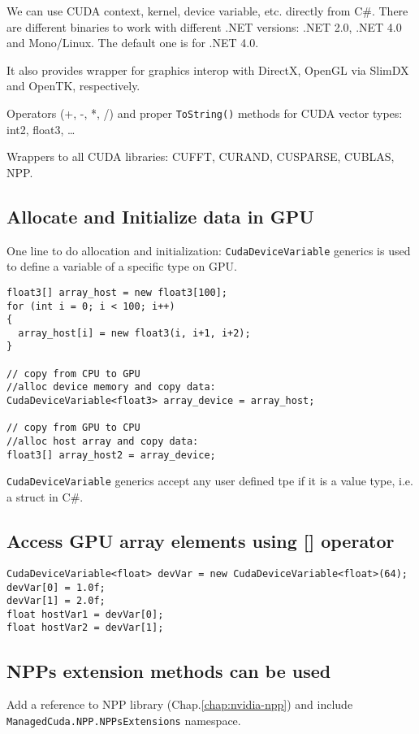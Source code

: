 We can use CUDA context, kernel, device variable, etc. directly from C\#.
There are different binaries to work with different .NET versions: .NET 2.0,
.NET 4.0 and Mono/Linux. The default one is for .NET 4.0.

It also provides wrapper for graphics interop with DirectX, OpenGL via SlimDX
and OpenTK, respectively. 

Operators (+, -, *, /) and proper \verb!ToString()! methods for CUDA vector
types: int2, float3, \ldots

Wrappers to all CUDA libraries: CUFFT, CURAND, CUSPARSE, CUBLAS, NPP.

\subsection{Allocate and Initialize data in GPU}

One line to do allocation and initialization: \verb!CudaDeviceVariable! generics
is used to define a variable of a specific type on GPU.
\begin{verbatim}
float3[] array_host = new float3[100];
for (int i = 0; i < 100; i++)
{
  array_host[i] = new float3(i, i+1, i+2);
}

// copy from CPU to GPU
//alloc device memory and copy data:
CudaDeviceVariable<float3> array_device = array_host;

// copy from GPU to CPU
//alloc host array and copy data: 
float3[] array_host2 = array_device; 
\end{verbatim}

 \verb!CudaDeviceVariable! generics accept any user defined tpe if it is a value
 type, i.e. a struct in C\#.

\subsection{Access GPU array elements using [] operator}

\begin{verbatim}
CudaDeviceVariable<float> devVar = new CudaDeviceVariable<float>(64);
devVar[0] = 1.0f;
devVar[1] = 2.0f;
float hostVar1 = devVar[0];
float hostVar2 = devVar[1];
\end{verbatim}

\subsection{NPPs extension methods can be used}

Add a reference to NPP library (Chap.\ref{chap:nvidia-npp}) and include
\verb!ManagedCuda.NPP.NPPsExtensions! namespace. 


